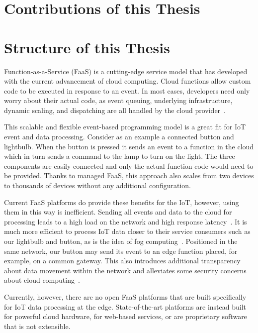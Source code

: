 \section{Contributions of this Thesis}
\label{sec:contributions}

\section{Structure of this Thesis}
\label{sec:structure}

Function-as-a-Service (FaaS) is a cutting-edge service model that has developed with the current advancement of cloud computing.
Cloud functions allow custom code to be executed in response to an event.
In most cases, developers need only worry about their actual code, as event queuing, underlying infrastructure, dynamic scaling, and dispatching are all handled by the cloud provider~\cite{Baldini2017-zf,McGrath2017-or}.

This scalable and flexible event-based programming model is a great fit for IoT event and data processing.
Consider as an example a connected button and lightbulb.
When the button is pressed it sends an event to a function in the cloud which in turn sends a command to the lamp to turn on the light.
The three components are easily connected and only the actual function code would need to be provided.
Thanks to managed FaaS, this approach also scales from two devices to thousands of devices without any additional configuration.

Current FaaS platforms do provide these benefits for the IoT, however, using them in this way is inefficient.
Sending all events and data to the cloud for processing leads to a high load on the network and high response latency~\cite{paper_zhang_cloud_is_not_enough_GDP,paper_bermbach_fog_computing}.
It is much more efficient to process IoT data closer to their service consumers such as our lightbulb and button, as is the idea of fog computing~\cite{Bermbach2020-sf,Pfandzelter2019-so}.
Positioned in the same network, our button may send its event to an edge function placed, for example, on a common gateway.
This also introduces additional transparency about data movement within the network and alleviates some security concerns about cloud computing~\cite{Bonomi2012-if,paper_bermbach_fog_computing}.

Currently, however, there are no open FaaS platforms that are built specifically for IoT data processing at the edge.
State-of-the-art platforms are instead built for powerful cloud hardware, for web-based services, or are proprietary software that is not extensible.

